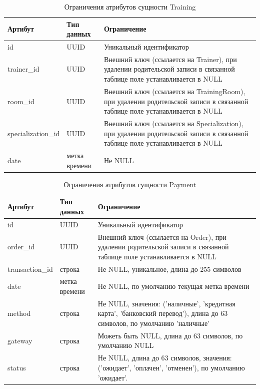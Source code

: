 \begin{table}[H]
	\centering
	\begin{tabular}{|p{3.5cm}|p{3.5cm}|p{8.5cm}|}
		\hline
		\textbf{Артибут}             & \textbf{Тип данных}   & \textbf{Ограничение}             \\ \hline
		id                            & UUID                & Уникальный идентификатор         \\ \hline
		trainer\_id                   & UUID                  & Внешний ключ (ссылается на Trainer), при удалении родительской записи в связанной таблице поле устанавливается в NULL \\ \hline
		room\_id                      & UUID                 & Внешний ключ (ссылается на TrainingRoom), при удалении родительской записи в связанной таблице поле устанавливается в NULL\\ \hline
		specialization\_id                      & UUID                 & Внешний ключ (ссылается на Specialization), при удалении родительской записи в связанной таблице поле устанавливается в NULL\\ \hline
		date                   & метка времени                & Не NULL \\ \hline
	\end{tabular}
	\caption{Ограничения атрибутов сущности Training}
\end{table}


\begin{table}[H]
	\centering
	\begin{tabular}{|p{3.5cm}|p{3.5cm}|p{8.5cm}|}
		\hline
		\textbf{Артибут}             & \textbf{Тип данных}   & \textbf{Ограничение}             \\ \hline
		id                            & UUID                 & Уникальный идентификатор         \\ \hline
		order\_id                     & UUID                & Внешний ключ (ссылается на Order), при удалении родительской записи в связанной таблице поле устанавливается в NULL \\ \hline
		transaction\_id               & строка                  & Не NULL, уникальное, длина до 255 символов                      \\ \hline
		date                          & метка времени             & Не NULL, по умолчанию текущая метка времени \\ \hline
		method                        & строка                  & Не NULL, значения: ('наличные', 'кредитная карта', 'банковский перевод'), длина до 63 символов, по умолчанию 'наличные' \\ \hline
		gateway                       & строка               & Можеть быть NULL, длина до 63 символов, по умолчанию NULL                     \\ \hline
		status                        & строка               & Не NULL, длина до 63 символов, значения: ('ожидает', 'оплачен', 'отменен'), по умолчанию 'ожидает'. \\ \hline
	\end{tabular}
	\caption{Ограничения атрибутов сущности Payment}
\end{table}

